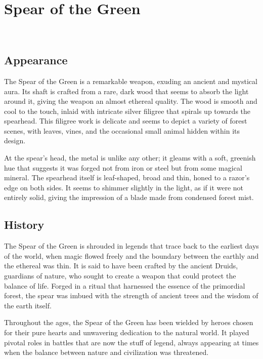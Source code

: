 
\chapter*{Spear of the Green}
\\

\section*{Appearance}
The Spear of the Green is a remarkable weapon, exuding an ancient and mystical aura. Its shaft is crafted from a rare, dark wood that seems to absorb the light around it, giving the weapon an almost ethereal quality. The wood is smooth and cool to the touch, inlaid with intricate silver filigree that spirals up towards the spearhead. This filigree work is delicate and seems to depict a variety of forest scenes, with leaves, vines, and the occasional small animal hidden within its design.

At the spear's head, the metal is unlike any other; it gleams with a soft, greenish hue that suggests it was forged not from iron or steel but from some magical mineral. The spearhead itself is leaf-shaped, broad and thin, honed to a razor's edge on both sides. It seems to shimmer slightly in the light, as if it were not entirely solid, giving the impression of a blade made from condensed forest mist.

\section*{History}
The Spear of the Green is shrouded in legends that trace back to the earliest days of the world, when magic flowed freely and the boundary between the earthly and the ethereal was thin. It is said to have been crafted by the ancient Druids, guardians of nature, who sought to create a weapon that could protect the balance of life. Forged in a ritual that harnessed the essence of the primordial forest, the spear was imbued with the strength of ancient trees and the wisdom of the earth itself.

Throughout the ages, the Spear of the Green has been wielded by heroes chosen for their pure hearts and unwavering dedication to the natural world. It played pivotal roles in battles that are now the stuff of legend, always appearing at times when the balance between nature and civilization was threatened.

